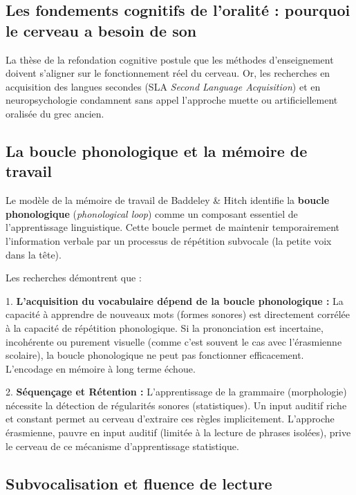 \subsection{Les fondements cognitifs de l'oralité : pourquoi le cerveau a besoin de son}

La thèse de la \og refondation cognitive\fg{} postule que les méthodes d'enseignement doivent
s'aligner sur le fonctionnement réel du cerveau. Or, les recherches en acquisition des langues
secondes (SLA \- \textit{Second Language Acquisition}) et en neuropsychologie condamnent sans appel
l'approche muette ou artificiellement oralisée du grec ancien.



\subsection{La boucle phonologique et la mémoire de travail}

Le modèle de la mémoire de travail de Baddeley \& Hitch identifie la \textbf{boucle phonologique}
(\textit{phonological loop}) comme un composant essentiel de l'apprentissage linguistique. Cette
boucle permet de maintenir temporairement l'information verbale par un processus de répétition
subvocale (la \og petite voix\fg{} dans la tête).\cite{ref19}

Les recherches démontrent que :

1. \textbf{L'acquisition du vocabulaire dépend de la boucle phonologique :} La capacité à apprendre
de nouveaux mots (formes sonores) est directement corrélée à la capacité de répétition
phonologique.\cite{ref21} Si la prononciation est incertaine, incohérente ou purement visuelle
(comme c'est souvent le cas avec l'érasmienne scolaire), la boucle phonologique ne peut pas
fonctionner efficacement. L'encodage en mémoire à long terme échoue.

2. \textbf{Séquençage et Rétention :} L'apprentissage de la grammaire (morphologie) nécessite la
détection de régularités sonores (statistiques). Un input auditif riche et constant permet au
cerveau d'extraire ces règles implicitement. L'approche érasmienne, pauvre en input auditif (limitée
à la lecture de phrases isolées), prive le cerveau de ce mécanisme d'apprentissage
statistique.\cite{ref21}



\subsection{Subvocalisation et fluence de lecture}

